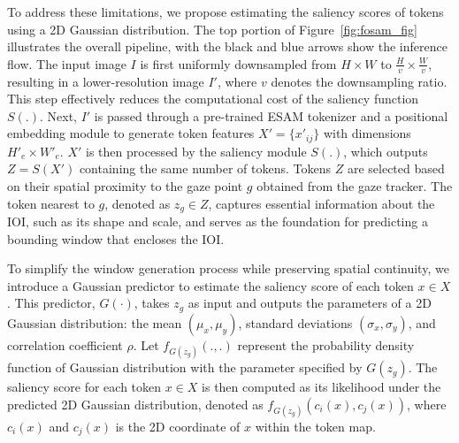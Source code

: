 \documentclass{article}
\begin{document}
To address these limitations, we propose estimating the saliency scores of tokens using a 2D Gaussian distribution. The top portion of Figure~\ref{fig:fosam_fig} illustrates the overall pipeline, with the black and blue arrows show the inference flow. The input image $I$ is first uniformly downsampled from $H \times W$ to $\frac{H}{v} \times \frac{W}{v}$, resulting in a lower-resolution image $I'$, where $v$ denotes the downsampling ratio. This step effectively reduces the computational cost of the saliency function $S(.)$. Next, $I'$ is passed through a pre-trained ESAM tokenizer and a positional embedding module to generate token features $X' = \{x'_{ij}\}$ with dimensions $H'_e \times W'_e$. $X'$ is then processed by the saliency module $S(.)$, which outputs $Z = S(X')$ containing the same number of tokens. Tokens $Z$ are selected based on their spatial proximity to the gaze point $g$ obtained from the gaze tracker. The token nearest to $g$, denoted as $z_g \in Z$, captures essential information about the IOI, such as its shape and scale, and serves as the foundation for predicting a bounding window that encloses the IOI. 

To simplify the window generation process while preserving spatial continuity, we introduce a Gaussian predictor to estimate the saliency score of each token $x\in X$. This predictor, $G(\cdot)$, takes $z_g$ as input and outputs the parameters of a 2D Gaussian distribution: the mean $(\mu_x, \mu_y)$, standard deviations $(\sigma_x, \sigma_y)$, and correlation coefficient $\rho$. Let $f_{G(z_{g})}(.,.)$ represent the probability density function of Gaussian distribution with the parameter specified by $G(z_{g})$. The saliency score for each token $x \in X$ is then computed as its likelihood under the predicted 2D Gaussian distribution, denoted as $f_{G(z_{g})}(c_{i}(x),c_{j}(x))$, where $c_{i}(x)$ and $c_{j}(x)$ is the 2D coordinate of $x$ within the token map.


\end{document}
